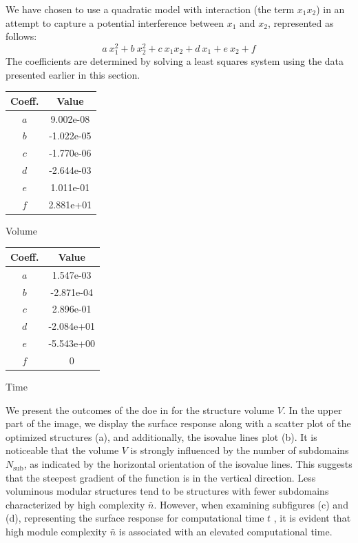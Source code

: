 We have chosen to use a quadratic model with interaction (the term $x_1x_2$) in an attempt to capture a potential interference between $x_1$ and $x_2$, represented as follows:
\begin{equation}
    a\:x_1^2+b\:x_2^2+c\:x_1x_2+d\:x_1+e\:x_2+f
\end{equation}
The coefficients are determined by solving a least squares system using the data presented earlier in this section.

\begin{margintable}
    \small
    \centering
    \begin{tabular}{cS[table-number-alignment = center, table-format = 1.2e1]}
    \toprule
    \textbf{Coeff.} & {\textbf{Value}} \\ \midrule
    $a$ & 9.002e-08    \\
    $b$ &  -1.022e-05   \\
    $c$ &  -1.770e-06   \\
    $d$ &  -2.644e-03   \\
    $e$ &   1.011e-01  \\
    $f$ &   2.881e+01  \\
    \bottomrule
    \end{tabular}
    \caption{Volume}
    \label{tab:05_doe_coeff_v}
\end{margintable}

\begin{margintable}
    \small
    \centering
    \begin{tabular}{cS[table-number-alignment = center, table-format = 1.2e1]}
    \toprule
    \textbf{Coeff.} & {\textbf{Value}} \\ \midrule
    $a$ & 1.547e-03    \\
    $b$ & -2.871e-04    \\
    $c$ &  2.896e-01   \\
    $d$ &  -2.084e+01   \\
    $e$ &  -5.543e+00   \\
    $f$ & 0    \\
    \bottomrule
    \end{tabular}
    \caption{Time}
    \label{tab:05_doe_coeff_t}
\end{margintable}

We present the outcomes of the \gls{doe} in  for the structure volume $V$. In the upper part of the image, we display the surface response along with a scatter plot of the optimized structures (a), and additionally, the isovalue lines plot (b). It is noticeable that the volume $V$ is strongly influenced by the number of subdomains $N_\text{sub}$, as indicated by the horizontal orientation of the isovalue lines. This suggests that the steepest gradient of the function is in the vertical direction. Less voluminous modular structures tend to be structures with fewer subdomains characterized by high complexity $\bar{n}$. However, when examining subfigures (c) and (d), representing the surface response for computational time $t$ , it is evident that high module complexity $\bar{n}$ is associated with an elevated computational time.

